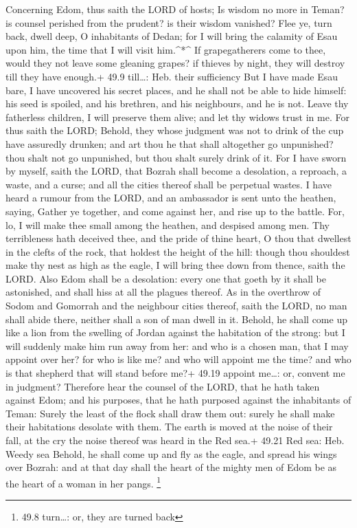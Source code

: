  Concerning Edom, thus saith the LORD of hosts; Is wisdom no
more in Teman? is counsel perished from the prudent? is their wisdom
vanished?  Flee ye, turn back, dwell deep, O inhabitants of
Dedan; for I will bring the calamity of Esau upon him, the time that I
will visit him.\^{}*\^{}  If grapegatherers come to thee,
would they not leave some gleaning grapes? if thieves by night, they
will destroy till they have enough.+ 49.9 till\ldots: Heb. their
sufficiency  But I have made Esau bare, I have uncovered
his secret places, and he shall not be able to hide himself: his seed is
spoiled, and his brethren, and his neighbours, and he is not.
 Leave thy fatherless children, I will preserve them alive;
and let thy widows trust in me.  For thus saith the LORD;
Behold, they whose judgment was not to drink of the cup have assuredly
drunken; and art thou he that shall altogether go unpunished? thou shalt
not go unpunished, but thou shalt surely drink of it.  For
I have sworn by myself, saith the LORD, that Bozrah shall become a
desolation, a reproach, a waste, and a curse; and all the cities thereof
shall be perpetual wastes.  I have heard a rumour from the
LORD, and an ambassador is sent unto the heathen, saying, Gather ye
together, and come against her, and rise up to the battle. 
For, lo, I will make thee small among the heathen, and despised among
men.  Thy terribleness hath deceived thee, and the pride of
thine heart, O thou that dwellest in the clefts of the rock, that
holdest the height of the hill: though thou shouldest make thy nest as
high as the eagle, I will bring thee down from thence, saith the LORD.
 Also Edom shall be a desolation: every one that goeth by
it shall be astonished, and shall hiss at all the plagues thereof.
 As in the overthrow of Sodom and Gomorrah and the
neighbour cities thereof, saith the LORD, no man shall abide there,
neither shall a son of man dwell in it.  Behold, he shall
come up like a lion from the swelling of Jordan against the habitation
of the strong: but I will suddenly make him run away from her: and who
is a chosen man, that I may appoint over her? for who is like me? and
who will appoint me the time? and who is that shepherd that will stand
before me?+ 49.19 appoint me\ldots: or, convent me in judgment?
 Therefore hear the counsel of the LORD, that he hath taken
against Edom; and his purposes, that he hath purposed against the
inhabitants of Teman: Surely the least of the flock shall draw them out:
surely he shall make their habitations desolate with them. 
The earth is moved at the noise of their fall, at the cry the noise
thereof was heard in the Red sea.+ 49.21 Red sea: Heb. Weedy sea
 Behold, he shall come up and fly as the eagle, and spread
his wings over Bozrah: and at that day shall the heart of the mighty men
of Edom be as the heart of a woman in her pangs. \footnote{49.8
  turn\ldots: or, they are turned back}

